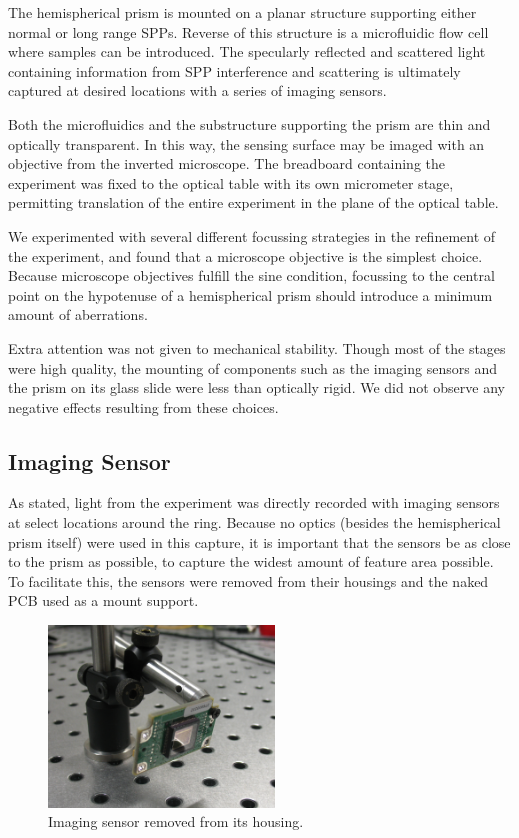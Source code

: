The hemispherical prism is mounted on a planar structure supporting either
normal or long range SPPs.  Reverse of this structure is a microfluidic
flow cell where samples can be introduced.  The specularly reflected and
scattered light containing information from SPP interference and scattering
is ultimately captured at desired locations with a series of imaging
sensors.

Both the microfluidics and the substructure supporting the prism are thin and
optically transparent.  In this way, the sensing surface may be imaged with
an objective from the inverted microscope.  The breadboard containing the
experiment was fixed to the optical table with its own micrometer stage,
permitting translation of the entire experiment in the plane of the optical
table.

We experimented with several different focussing strategies in the
refinement of the experiment, and found that a microscope objective is the
simplest choice.  Because microscope objectives fulfill the sine condition,
focussing to the central point on the hypotenuse of a hemispherical prism
should introduce a minimum amount of aberrations.

Extra attention was not given to mechanical stability.  Though most of the
stages were high quality, the mounting of components such as the imaging
sensors and the prism on its glass slide were less than optically rigid.
We did not observe any negative effects resulting from these choices.

\subsection{Imaging Sensor}
As stated, light from the experiment was directly recorded with imaging
sensors at select locations around the ring.  Because no optics (besides
the hemispherical prism itself) were used in this capture, it is important
that the sensors be as close to the prism as possible, to capture the
widest amount of feature area possible.  To facilitate this, the sensors
were removed from their housings and the naked PCB used as a mount support.
\begin{figure}[ht]
 \centering
 \includegraphics[width=6cm,keepaspectratio]{experimental/figures/nakedsensorcrop.jpg}
 \caption{Imaging sensor removed from its housing.}
 \label{fig:imagingsensor}
\end{figure}

